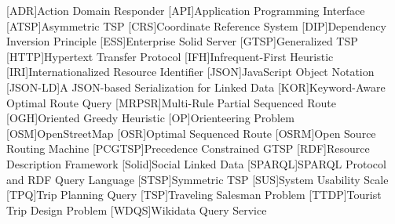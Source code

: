 
\begin{acronym}[WWWWW]
[ADR]{Action Domain Responder}
[API]{Application Programming Interface}
[ATSP]{Asymmetric TSP}
[CRS]{Coor\-di\-nate Reference System}
[DIP]{Dependency Inversion Principle}
[ESS]{Enterprise Solid Server}
[GTSP]{Generalized TSP}
[HTTP]{Hypertext Transfer Protocol}
[IFH]{Infrequent-First Heuristic}
[IRI]{Internationalized Resource Identifier}
[JSON]{JavaScript Object Notation}
[JSON-LD]{A JSON-based Serialization for Linked Data}
[KOR]{Keyword-Aware Optimal Route Query}
[MRPSR]{Multi-Rule Partial Sequenced Route}
[OGH]{Oriented Greedy Heuristic}
[OP]{Orienteering Problem}
[OSM]{OpenStreetMap}
[OSR]{Optimal Sequenced Route}
[OSRM]{Open Source Routing Machine}
[PCGTSP]{Precedence Constrained GTSP}
[RDF]{Resource Description Framework}
[Solid]{Social Linked Data}
[SPARQL]{SPARQL Protocol and RDF Query Language}
[STSP]{Symmetric TSP}
[SUS]{System Usability Scale}
[TPQ]{Trip Planning Query}
[TSP]{Traveling Salesman Problem}
[TTDP]{Tourist Trip Design Problem}
[WDQS]{Wikidata Query Service}
\end{acronym}
